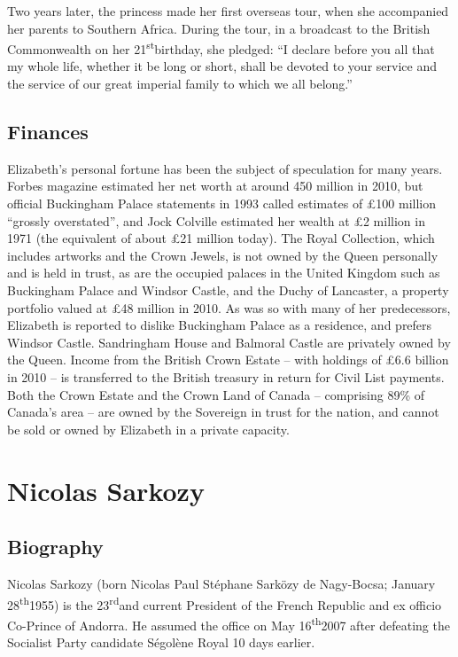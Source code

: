 \documentclass[11pt;a4paper]{article}
\newcommand{\theu}[0]{\textsuperscript{th}}
\newcommand{\st}[0]{\textsuperscript{st}}
\newcommand{\rd}[0]{\textsuperscript{rd}}
\begin{document}
Two years later, the princess made her first overseas tour, when she accompanied her parents to Southern Africa. During the tour, in a broadcast to the British Commonwealth on her 21\st birthday, she pledged: ``I declare before you all that my whole life, whether it be long or short, shall be devoted to your service and the service of our great imperial family to which we all belong.''

\subsection*{Finances}

Elizabeth's personal fortune has been the subject of speculation for many years. Forbes magazine estimated her net worth at around 450 million in 2010, but official Buckingham Palace statements in 1993 called estimates of \pounds 100 million ``grossly overstated'', and Jock Colville estimated her wealth at \pounds 2 million in 1971 (the equivalent of about \pounds 21 million today). The Royal Collection, which includes artworks and the Crown Jewels, is not owned by the Queen personally and is held in trust, as are the occupied palaces in the United Kingdom such as Buckingham Palace and Windsor Castle, and the Duchy of Lancaster, a property portfolio valued at \pounds 48 million in 2010. As was so with many of her predecessors, Elizabeth is reported to dislike Buckingham Palace as a residence, and prefers Windsor Castle. Sandringham House and Balmoral Castle are privately owned by the Queen. Income from the British Crown Estate -- with holdings of \pounds 6.6 billion in 2010 -- is transferred to the British treasury in return for Civil List payments. Both the Crown Estate and the Crown Land of Canada -- comprising 89\% of Canada's area -- are owned by the Sovereign in trust for the nation, and cannot be sold or owned by Elizabeth in a private capacity. 

\newpage

\section*{Nicolas Sarkozy}

\subsection*{Biography}

Nicolas Sarkozy (born Nicolas Paul Stéphane Sarközy de Nagy-Bocsa; January 28\theu 1955) is the 23\rd and current President of the French Republic and ex officio Co-Prince of Andorra. He assumed the office on May 16\theu 2007 after defeating the Socialist Party candidate Ségolène Royal 10 days earlier.
\end{document}
